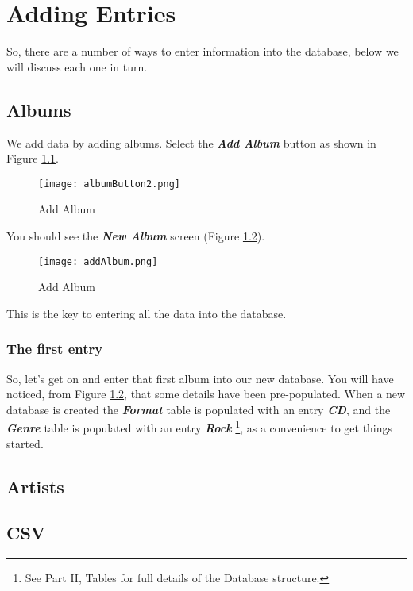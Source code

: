 \chapter{Adding Entries}
So, there are a number of ways to enter information into the database, below we will discuss each one in turn.
\section{Albums}
\label{sect:albums}
We add data by adding albums.  Select the \textit{\textbf{Add Album}} button 
as shown in Figure \ref{fig:albumbutton2}.
\begin{figure}[h]
\texttt{[image: albumButton2.png]}
\caption{Add Album}
\label{fig:albumbutton2}
\end{figure}
You should see the \textit{\textbf{New Album}} screen (Figure \ref{fig:addemptyalbum}).
\begin{figure}[h]
\texttt{[image: addAlbum.png]}
\caption{Add Album}
\label{fig:addemptyalbum}
\end{figure}
This is the key to entering all the data into the database.

\subsection{The first entry}
So, let's get on and enter that first album into our new database.  You will have noticed, from Figure \ref{fig:addemptyalbum}, that some details have been pre-populated.  When a new database is created the \textit{\textbf{Format}} table is populated with an entry \textit{\textbf{CD}}, and the
\textit{\textbf{Genre}} table is populated with an entry \textit{\textbf{Rock}} \footnote{See Part II, Tables for  full details of the Database structure.}, as a convenience to get things started.

\section{Artists}
\section{CSV}
\label{sect:csv}